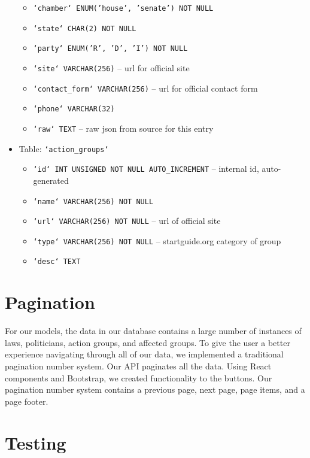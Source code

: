 \documentclass[12pt]{article}
\newcommand{\code}[1]{\texttt{#1}}
\begin{document}
\begin{itemize}
\begin{itemize}
		\item \code{`chamber` ENUM('house', 'senate') NOT NULL}
		\item \code{`state` CHAR(2) NOT NULL}
		\item \code{`party` ENUM('R', 'D', 'I') NOT NULL}
		\item \code{`site` VARCHAR(256)}						-- url for official site
		\item \code{`contact\_form` VARCHAR(256)}				-- url for official contact form
		\item \code{`phone` VARCHAR(32)}
		\item \code{`raw` TEXT}									-- raw json from source for this entry
	\end{itemize}
	\item[] Table: \code{`action\_groups`}
	\begin{itemize}
		\item \code{`id` INT UNSIGNED NOT NULL AUTO\_INCREMENT}	-- internal id, auto-generated
		\item \code{`name` VARCHAR(256) NOT NULL}
		\item \code{`url` VARCHAR(256) NOT NULL}				-- url of official site
		\item \code{`type` VARCHAR(256) NOT NULL}				-- startguide.org category of group
		\item \code{`desc` TEXT}
	\end{itemize}
\end{itemize}


\section{Pagination}

For our models, the data in our database contains a large number of instances of laws, politicians, action groups, and affected groups. To give the user a better experience navigating through all of our data, we implemented a traditional pagination number system. Our API paginates all the data. Using React components and Bootstrap, we created functionality to the buttons. Our pagination number system contains a previous page, next page, page items, and a page footer.

\section{Testing}
\end{document}
